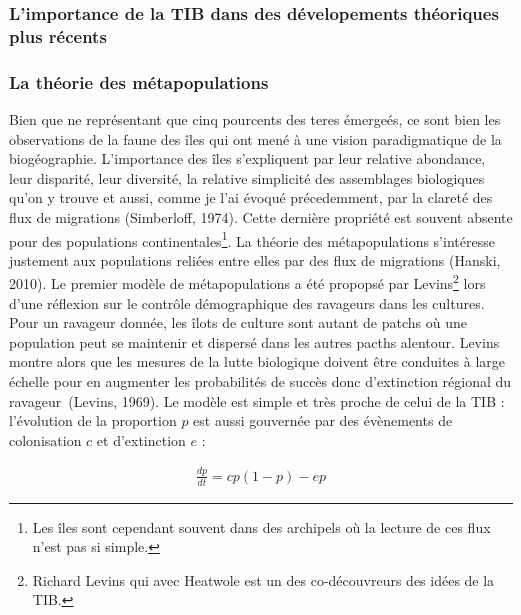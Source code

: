 \subsubsection*{L'importance de la TIB dans des dévelopements théoriques
plus
récents}\label{limportance-de-la-tib-dans-des-duxe9velopements-thuxe9oriques-plus-ruxe9cents}

\subsubsection*{La théorie des
métapopulations}\label{la-thuxe9orie-des-muxe9tapopulations}

Bien que ne représentant que cinq pourcents des teres émergeés, ce sont
bien les observations de la faune des îles qui ont mené à une vision
paradigmatique de la biogéographie. L'importance des îles s'expliquent
par leur relative abondance, leur disparité, leur diversité, la relative
simplicité des assemblages biologiques qu'on y trouve et aussi, comme je
l'ai évoqué précedemment, par la clareté des flux de migrations
(Simberloff, 1974). Cette dernière propriété est souvent absente pour
des populations continentales\footnote{Les îles sont cependant souvent
  dans des archipels où la lecture de ces flux n'est pas si simple.}. La
théorie des métapopulations s'intéresse justement aux populations
reliées entre elles par des flux de migrations (Hanski, 2010). Le
premier modèle de métapopulations a été propopsé par Levins\footnote{Richard
  Levins qui avec Heatwole est un des co-découvreurs des idées de la
  TIB.} lors d'une réflexion sur le contrôle démographique des ravageurs
dans les cultures. Pour un ravageur donnée, les îlots de culture sont
autant de patchs où une population peut se maintenir et dispersé dans
les autres pacths alentour. Levins montre alors que les mesures de la
lutte biologique doivent être conduites à large échelle pour en
augmenter les probabilités de succès donc d'extinction régional du
ravageur~(Levins, 1969). Le modèle est simple et très proche de celui de
la TIB : l'évolution de la proportion \(p\) est aussi gouvernée par des
évènements de colonisation \(c\) et d'extinction \(e\) :

\begin{eqnarray}
\label{eqMW}
\frac{dp}{dt} = cp(1-p)-ep
\end{eqnarray}


